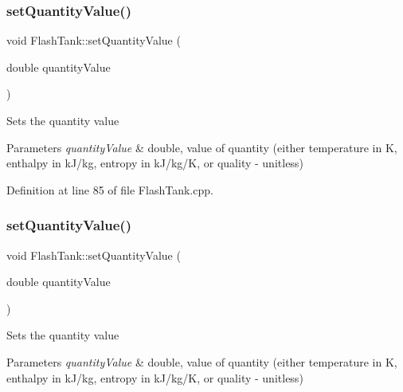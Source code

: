 \subsubsection{\texorpdfstring{set\+Quantity\+Value()}{setQuantityValue()}\hspace{0.1cm}{\footnotesize\ttfamily [1/3]}}
{\footnotesize\ttfamily void Flash\+Tank\+::set\+Quantity\+Value (\begin{DoxyParamCaption}\item[{double}]{quantity\+Value }\end{DoxyParamCaption})}

Sets the quantity value 
\begin{DoxyParams}{Parameters}
{\em quantity\+Value} & double, value of quantity (either temperature in K, enthalpy in k\+J/kg, entropy in k\+J/kg/K, or quality -\/ unitless) \\
\hline
\end{DoxyParams}


Definition at line 85 of file Flash\+Tank.\+cpp.

\mbox{\label{class_flash_tank_ac7392743aeaf8de6ce368814ea42e236}} 
\subsubsection{\texorpdfstring{set\+Quantity\+Value()}{setQuantityValue()}\hspace{0.1cm}{\footnotesize\ttfamily [2/3]}}
{\footnotesize\ttfamily void Flash\+Tank\+::set\+Quantity\+Value (\begin{DoxyParamCaption}\item[{double}]{quantity\+Value }\end{DoxyParamCaption})}

Sets the quantity value 
\begin{DoxyParams}{Parameters}
{\em quantity\+Value} & double, value of quantity (either temperature in K, enthalpy in k\+J/kg, entropy in k\+J/kg/K, or quality -\/ unitless) \\
\hline
\end{DoxyParams}
\mbox{\label{class_flash_tank_ac7392743aeaf8de6ce368814ea42e236}} 
